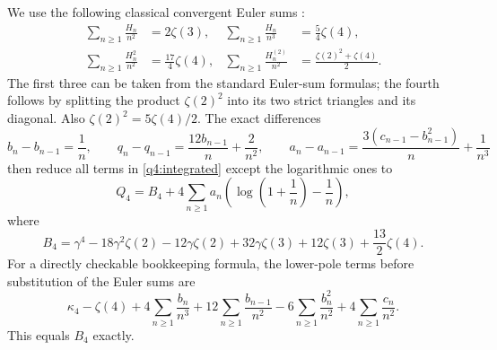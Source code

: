 \documentclass[11pt,a4paper]{article}
\numberwithin{equation}{section}
\theoremstyle{definition}
\theoremstyle{remark}
\begin{document}
We use the following classical convergent Euler sums
\cite[Equations~25.16.8 and 25.16.13]{DLMF}:
\begin{align*}
 \sum_{n\geq1}\frac{H_n}{n^2}&=2\zeta(3),&
 \sum_{n\geq1}\frac{H_n}{n^3}&=\frac54\zeta(4),\\
 \sum_{n\geq1}\frac{H_n^2}{n^2}&=\frac{17}4\zeta(4),&
 \sum_{n\geq1}\frac{H_n^{(2)}}{n^2}
     &=\frac{\zeta(2)^2+\zeta(4)}2.
\end{align*}
The first three can be taken from the standard Euler-sum formulas; the
fourth follows by splitting the product $\zeta(2)^2$ into its two strict
triangles and its diagonal.  Also $\zeta(2)^2=5\zeta(4)/2$.
The exact differences
\begin{equation}\label{q4:differences}
 b_n-b_{n-1}=\frac1n,\qquad
 q_n-q_{n-1}=\frac{12b_{n-1}}n+\frac2{n^2},\qquad
 a_n-a_{n-1}=\frac{3(c_{n-1}-b_{n-1}^2)}n+\frac1{n^3}
\end{equation}
then reduce all terms in \eqref{q4:integrated} except the logarithmic
ones to
\begin{equation}\label{q4:base}
 Q_4=B_4+4\sum_{n\geq1}a_n
          \left(\log\left(1+\frac1n\right)-\frac1n\right),
\end{equation}
where
\[
 B_4=\gamma^4-18\gamma^2\zeta(2)-12\gamma\zeta(2)
             +32\gamma\zeta(3)+12\zeta(3)+\frac{13}2\zeta(4).
\]
For a directly checkable bookkeeping formula, the lower-pole terms before
substitution of the Euler sums are
\[
 \kappa_4-\zeta(4)
 +4\sum_{n\geq1}\frac{b_n}{n^3}
 +12\sum_{n\geq1}\frac{b_{n-1}}{n^2}
 -6\sum_{n\geq1}\frac{b_n^2}{n^2}
 +4\sum_{n\geq1}\frac{c_n}{n^2}.
\]
This equals $B_4$ exactly.
\end{document}

